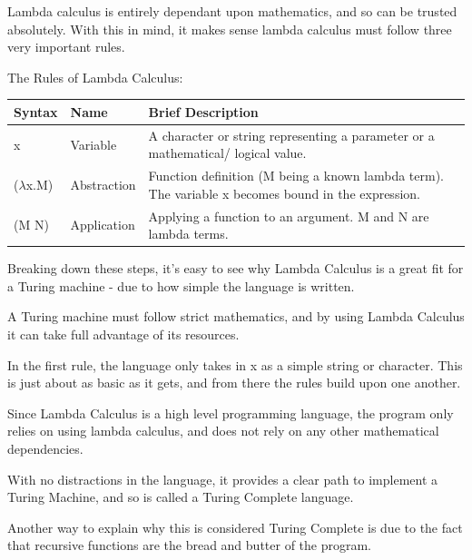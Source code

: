 \documentclass{article}
\begin{document}
\medskip\noindent
Lambda calculus is entirely dependant upon mathematics, and so can be trusted absolutely. With this in mind, it makes sense lambda calculus must follow three very important rules\cite{LC}.

\medskip
\begin{center}
The Rules of Lambda Calculus:

\medskip

\medskip\medskip\noindent\begin{tabularx}{.95\textwidth} { 
| >{\centering\arraybackslash}X 
| >{\centering\arraybackslash}X 
| >{\centering\arraybackslash}X | }
\hline
Syntax & Name & Brief Description\\
\hline
\medskip x & \medskip Variable & A character or string representing a parameter or a mathematical/ logical value.\\
\hline
\medskip ($\lambda$x.M) & \medskip Abstraction & Function definition (M being a known lambda term). The variable x becomes bound in the expression. \\
\hline
\medskip (M N) & \medskip Application & Applying a function to an argument. M and N are lambda terms.\\
\hline
\end{tabularx}
\end{center}

\medskip\noindent
Breaking down these steps, it's easy to see why Lambda Calculus is a great fit for a Turing machine - due to how simple the language is written. 

\medskip\noindent
A Turing machine must follow strict mathematics, and by using Lambda Calculus it can take full advantage of its resources.

\medskip\noindent
In the first rule, the language only takes in x as a simple string or character. This is just about as basic as it gets, and from there the rules build upon one another. 

\medskip\noindent
Since Lambda Calculus is a high level programming language, the program only relies on using lambda calculus, and does not rely on any other mathematical dependencies. 

\medskip\noindent
With no distractions in the language, it provides a clear path to implement a Turing Machine, and so is called a Turing Complete language. 

\medskip\noindent
Another way to explain why this is considered Turing Complete is due to the fact that recursive functions are the bread and butter of the program. 
\end{document}
